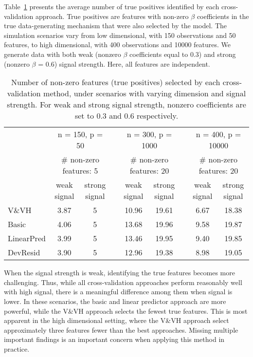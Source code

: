 Table~\ref{Tab:power} presents the average number of true positives identified by each cross-validation approach. True positives are features with non-zero $\beta$ coefficients in the true data-generating mechanism that were also selected by the model. The simulation scenarios vary from low dimensional, with 150 observations and 50 features, to high dimensional, with 400 observations and 10000 features. We generate data with both weak (nonzero $\beta$ coefficients equal to 0.3) and strong (nonzero $\beta$ = 0.6) signal strength. Here, all features are independent.

\begin{table}[!htb]
\setlength{\tabcolsep}{3pt}
\caption{\label{Tab:power} Number of non-zero features (true positives) selected by each cross-validation method, under scenarios with varying dimension and signal strength. For weak and strong signal strength, nonzero coefficients are set to 0.3 and 0.6 respectively.}
\centering
\begin{tabular}[t]{l cc c cc c cc}
\toprule
&\multicolumn{2}{c}{n = 150, p = 50} & & \multicolumn{2}{c}{n = 300, p = 1000} & & \multicolumn{2}{c}{n = 400, p = 10000} \\
&\multicolumn{2}{c}{$\#$ non-zero features: 5} & & \multicolumn{2}{c}{$\#$ non-zero features: 20} & & \multicolumn{2}{c}{$\#$ non-zero features: 20} \\
\cline{2-3} \cline{5-6} \cline{8-9}
& weak signal & strong signal & & weak signal & strong signal && weak signal & strong signal\\
V\&VH        & 3.87 & 5& & 10.96 & 19.61 & & 6.67 & 18.38\\
Basic          & 4.06 & 5& & 13.68 & 19.96 & & 9.58 & 19.87\\
LinearPred  & 3.99 & 5& & 13.46 & 19.95 & & 9.40 & 19.85\\
DevResid    & 3.90 & 5& & 12.96 & 19.38 & & 8.98 & 19.05\\
\bottomrule
\end{tabular}
\end{table}

When the signal strength is weak, identifying the true features becomes more challenging. Thus, while all cross-validation approaches perform reasonably well with high signal, there is a meaningful difference among them when signal is lower. In these scenarios, the basic and linear predictor approach are more powerful, while the V\&VH approach selects the fewest true features. This is most apparent in the high dimensional setting, where the V\&VH approach select approximately three features fewer than the best approaches. Missing multiple important findings is an important concern when applying this method in practice.

